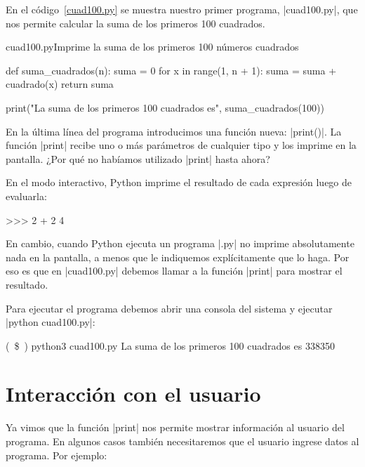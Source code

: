 En el código~\ref{cuad100.py} se muestra nuestro primer programa, |cuad100.py|,
que nos permite calcular la suma de los primeros 100 cuadrados.

\begin{codigo}{cuad100.py}{Imprime la suma de los primeros 100 números
    cuadrados}
\label{cuad100.py}
\begin{codigo-python}
def suma_cuadrados(n):
    suma = 0
    for x in range(1, n + 1):
        suma = suma + cuadrado(x)
    return suma

print("La suma de los primeros 100 cuadrados es", suma_cuadrados(100))
\end{codigo-python}
\end{codigo}

En la última línea del programa introducimos una función nueva: |print()|.
La función |print| recibe uno o más parámetros de cualquier tipo y los imprime
en la pantalla. ¿Por qué no habíamos utilizado |print| hasta ahora?

En el modo interactivo, Python imprime el resultado de cada expresión luego de
evaluarla:

\begin{codigo-python-sn}
>>> 2 + 2
4
\end{codigo-python-sn}

En cambio, cuando Python ejecuta un programa |.py| no imprime absolutamente
nada en la pantalla, a menos que le indiquemos explícitamente que lo haga. Por
eso es que en |cuad100.py| debemos llamar a la función |print| para mostrar el
resultado.

Para ejecutar el programa debemos abrir una consola del sistema y ejecutar
|python cuad100.py|:

\begin{codigo-nohl-sn}
(~\$~) python3 cuad100.py
La suma de los primeros 100 cuadrados es 338350
\end{codigo-nohl-sn}

\section{Interacción con el usuario}

Ya vimos que la función |print| nos permite mostrar información al usuario del
programa. En algunos casos también necesitaremos que el usuario ingrese datos
al programa. Por ejemplo:

